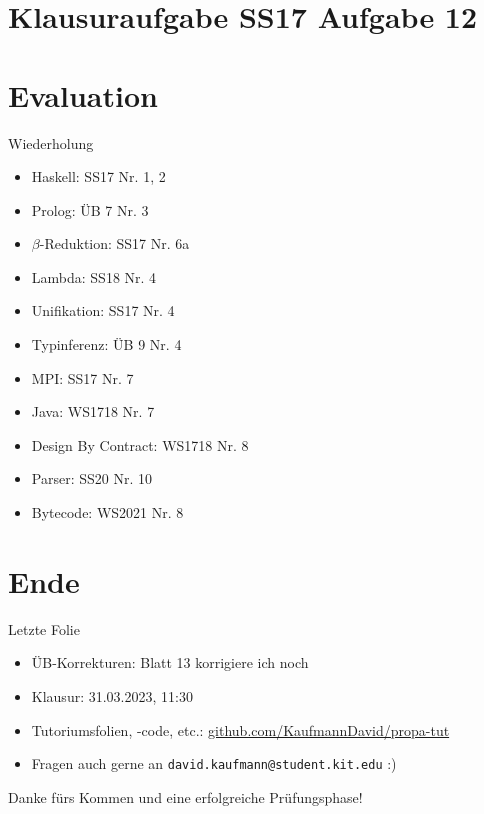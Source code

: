 \documentclass{beamer}
\begin{document}
\section{Klausuraufgabe SS17 Aufgabe 12}

\section{Evaluation}

\begin{frame}{Wiederholung}
    \begin{itemize}
        \item Haskell: SS17 Nr. 1, 2
        \item Prolog: ÜB 7 Nr. 3
        \item $\beta$-Reduktion: SS17 Nr. 6a
        \item Lambda: SS18 Nr. 4
        \item Unifikation: SS17 Nr. 4
        \item Typinferenz: ÜB 9 Nr. 4
        \item MPI: SS17 Nr. 7
        \item Java: WS1718 Nr. 7
        \item Design By Contract: WS1718 Nr. 8
        \item Parser: SS20 Nr. 10
        \item Bytecode: WS2021 Nr. 8
    \end{itemize}
\end{frame}
\section{Ende}

\begin{frame}{Letzte Folie}
  \begin{itemize}
    \item ÜB-Korrekturen: Blatt 13 korrigiere ich noch
    \item Klausur: 31.03.2023, 11:30
    \item Tutoriumsfolien, -code, etc.: \href{https://github.com/KaufmannDavid/propa-tut}{github.com/KaufmannDavid/propa-tut}
    \item Fragen auch gerne an \texttt{david.kaufmann@student.kit.edu} :)
  \end{itemize}

  \vfill

  Danke fürs Kommen und eine erfolgreiche Prüfungsphase!
\end{frame}
\end{document}
